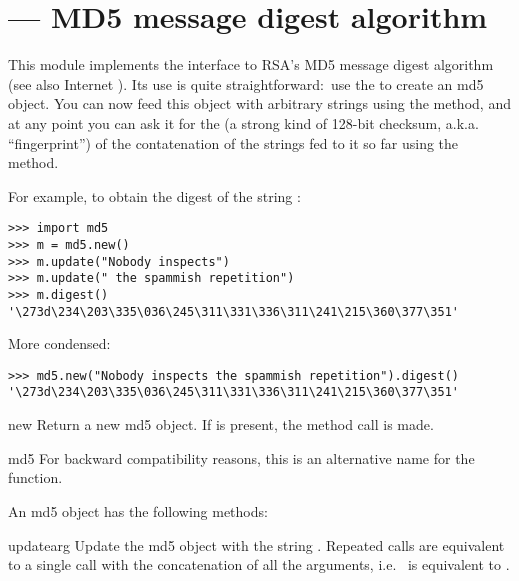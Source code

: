 \section{ ---
         MD5 message digest algorithm}



This module implements the interface to RSA's MD5 message digest
algorithm (see also Internet ).  Its use is quite
straightforward:\ use the  to create an md5 object.
You can now feed this object with arbitrary strings using the
 method, and at any point you can ask it for the
 (a strong kind of 128-bit checksum,
a.k.a. ``fingerprint'') of the contatenation of the strings fed to it
so far using the  method.

For example, to obtain the digest of the string :

\begin{verbatim}
>>> import md5
>>> m = md5.new()
>>> m.update("Nobody inspects")
>>> m.update(" the spammish repetition")
>>> m.digest()
'\273d\234\203\335\036\245\311\331\336\311\241\215\360\377\351'
\end{verbatim}

More condensed:

\begin{verbatim}
>>> md5.new("Nobody inspects the spammish repetition").digest()
'\273d\234\203\335\036\245\311\331\336\311\241\215\360\377\351'
\end{verbatim}

\begin{funcdesc}{new}{}
Return a new md5 object.  If  is present, the method call
 is made.
\end{funcdesc}

\begin{funcdesc}{md5}{}
For backward compatibility reasons, this is an alternative name for the
 function.
\end{funcdesc}

An md5 object has the following methods:

\begin{methoddesc}[md5]{update}{arg}
Update the md5 object with the string .  Repeated calls are
equivalent to a single call with the concatenation of all the
arguments, i.e.\  is equivalent to
.
\end{methoddesc}

